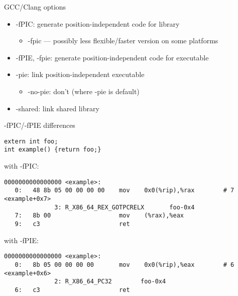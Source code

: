 
\begin{frame}{GCC/Clang options}
    \begin{itemize}
    \item -fPIC: generate position-independent code for library
        \begin{itemize}
        \item -fpic --- possibly less flexible/faster version on some platforms
        \end{itemize}
    \item -fPIE, -fpie: generate position-independent code for executable
    \item -pie: link position-independent executable
        \begin{itemize}
        \item -no-pie: don't (where -pie is default)
        \end{itemize}
    \item -shared: link shared library
    \end{itemize}
\end{frame}

\begin{frame}[fragile,label=picPie]{-fPIC/-fPIE differences}
\begin{Verbatim}[fontsize=\small]
extern int foo;
int example() {return foo;}
\end{Verbatim}
with -fPIC:
\begin{Verbatim}[fontsize=\small]
0000000000000000 <example>:
   0:   48 8b 05 00 00 00 00    mov    0x0(%rip),%rax        # 7 <example+0x7>
              3: R_X86_64_REX_GOTPCRELX       foo-0x4
   7:   8b 00                   mov    (%rax),%eax
   9:   c3                      ret
\end{Verbatim}
with -fPIE:
\begin{Verbatim}[fontsize=\small]
0000000000000000 <example>: 
   0:   8b 05 00 00 00 00       mov    0x0(%rip),%eax        # 6 <example+0x6>
              2: R_X86_64_PC32        foo-0x4
   6:   c3                      ret
\end{Verbatim}
\end{frame}

